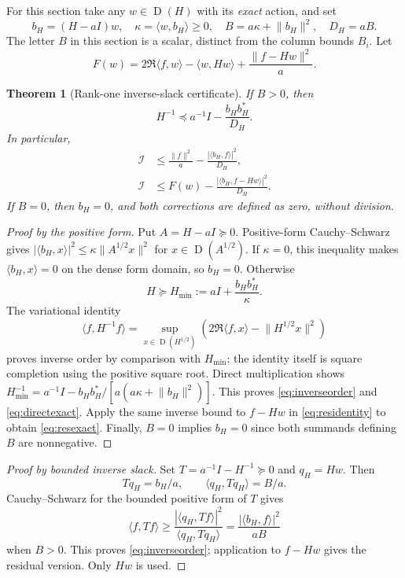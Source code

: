 \documentclass[11pt,a4paper]{article}
\newcommand{\Dom}{\operatorname{D}}
\newcommand{\ip}[2]{\langle #1,#2\rangle}
\newcommand{\norm}[1]{\lVert #1\rVert}
\newcommand{\Iresp}{\mathcal I}
\newtheorem{theorem}{Theorem}[section]
\theoremstyle{definition}
\theoremstyle{remark}
\numberwithin{equation}{section}
\begin{document}
For this section take any $w\in\Dom(H)$ with its \emph{exact} action,
and set
\begin{equation}\label{eq:rankdefs}
 b_H=(H-aI)w,\quad
 \kappa=\ip w{b_H}\ge0,\quad
 B=a\kappa+\norm{b_H}^2,\quad D_H=aB.
\end{equation}
The letter $B$ in this section is a scalar, distinct from the column
bounds $B_i$. Let
\begin{equation}\label{eq:F}
 F(w)=2\Re\ip fw-\ip w{Hw}+\frac{\norm{f-Hw}^2}{a}.
\end{equation}

\begin{theorem}[Rank-one inverse-slack certificate]\label{thm:rankone}
If $B>0$, then
\begin{equation}\label{eq:inverseorder}
 H^{-1}\preceq a^{-1}I-\frac{b_Hb_H^*}{D_H}.
\end{equation}
In particular,
\begin{align}
 \Iresp&\le \frac{\norm f^2}{a}
                    -\frac{|\ip{b_H}f|^2}{D_H},\label{eq:directexact}\\
 \Iresp&\le F(w)
                    -\frac{|\ip{b_H}{f-Hw}|^2}{D_H}.\label{eq:resexact}
\end{align}
If $B=0$, then $b_H=0$, and both corrections are defined as zero,
without division.
\end{theorem}
\begin{proof}[Proof by the positive form]
Put $A=H-aI\succeq0$. Positive-form Cauchy--Schwarz gives
$|\ip{b_H}x|^2\le\kappa\norm{A^{1/2}x}^2$ for
$x\in\Dom(A^{1/2})$. If $\kappa=0$, this inequality makes
$\ip{b_H}x=0$ on the dense form domain, so $b_H=0$.
Otherwise
\[
 H\succeq H_{\min}:=aI+\frac{b_Hb_H^*}{\kappa}.
\]
The variational identity
\[
 \ip f{H^{-1}f}
 =\sup_{x\in\Dom(H^{1/2})}
       \left(2\Re\ip fx-\norm{H^{1/2}x}^2\right)
\]
proves inverse order by comparison with $H_{\min}$; the identity itself
is square completion using the positive square root. Direct multiplication
shows
$H_{\min}^{-1}=a^{-1}I-b_Hb_H^*/[a(a\kappa+\norm{b_H}^2)]$.
This proves \eqref{eq:inverseorder} and \eqref{eq:directexact}.
Apply the same inverse bound to $f-Hw$ in
\eqref{eq:residentity} to obtain \eqref{eq:resexact}.
Finally, $B=0$ implies $b_H=0$ since both summands defining $B$
are nonnegative.
\end{proof}

\begin{proof}[Proof by bounded inverse slack]
Set $T=a^{-1}I-H^{-1}\succeq0$ and $q_H=Hw$. Then
\[
 Tq_H=b_H/a,\qquad \ip{q_H}{Tq_H}=B/a.
\]
Cauchy--Schwarz for the bounded positive form of $T$ gives
\[
 \ip f{Tf}\ge
 \frac{|\ip{q_H}{Tf}|^2}{\ip{q_H}{Tq_H}}
 =\frac{|\ip{b_H}f|^2}{aB}
\]
when $B>0$. This proves \eqref{eq:inverseorder}; application to
$f-Hw$ gives the residual version. Only $Hw$ is used.
\end{proof}
\end{document}
